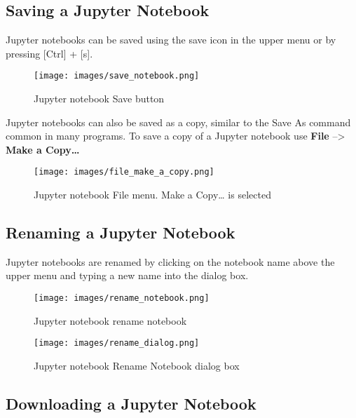 \documentclass{book}
\makeatletter
\def\maxwidth{\ifdim\Gin@nat@width>\linewidth\linewidth
\else\Gin@nat@width\fi}
\let\Oldincludegraphics\includegraphics
\renewcommand{\includegraphics}[1]{\Oldincludegraphics[width=.8\maxwidth]{#1}}
\makeatother
\begin{document}
    
        \hypertarget{saving-a-jupyter-notebook}{%
\subsection{Saving a Jupyter Notebook}\label{saving-a-jupyter-notebook}}

Jupyter notebooks can be saved using the save icon in the upper menu or
by pressing {[}Ctrl{]} + {[}s{]}.

\begin{figure}
\centering
\texttt{[image: images/save\_notebook.png]}
\caption{Jupyter notebook Save button}
\end{figure}

Jupyter notebooks can also be saved as a copy, similar to the Save As
command common in many programs. To save a copy of a Jupyter notebook
use \textbf{File} --\textgreater{} \textbf{Make a Copy\ldots{}}

\begin{figure}
\centering
\texttt{[image: images/file\_make\_a\_copy.png]}
\caption{Jupyter notebook File menu. Make a Copy\ldots{} is selected}
\end{figure}
    




    
        \hypertarget{renaming-a-jupyter-notebook}{%
\subsection{Renaming a Jupyter
Notebook}\label{renaming-a-jupyter-notebook}}

Jupyter notebooks are renamed by clicking on the notebook name above the
upper menu and typing a new name into the dialog box.

\begin{figure}
\centering
\texttt{[image: images/rename\_notebook.png]}
\caption{Jupyter notebook rename notebook}
\end{figure}

\begin{figure}
\centering
\texttt{[image: images/rename\_dialog.png]}
\caption{Jupyter notebook Rename Notebook dialog box}
\end{figure}
    




    
        \hypertarget{downloading-a-jupyter-notebook}{%
\subsection{Downloading a Jupyter
Notebook}\label{downloading-a-jupyter-notebook}}
\end{document}

